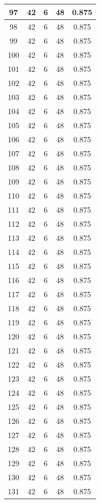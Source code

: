 \documentclass[letterpaper, 12pt]{article}
\begin{document}
\begin{longtable}{|c|c|c|c|c|}
\hline
97 & 42 & 6 & 48 & 0.875 \\
\hline
98 & 42 & 6 & 48 & 0.875 \\
\hline
99 & 42 & 6 & 48 & 0.875 \\
\hline
100 & 42 & 6 & 48 & 0.875 \\
\hline
101 & 42 & 6 & 48 & 0.875 \\
\hline
102 & 42 & 6 & 48 & 0.875 \\
\hline
103 & 42 & 6 & 48 & 0.875 \\
\hline
104 & 42 & 6 & 48 & 0.875 \\
\hline
105 & 42 & 6 & 48 & 0.875 \\
\hline
106 & 42 & 6 & 48 & 0.875 \\
\hline
107 & 42 & 6 & 48 & 0.875 \\
\hline
108 & 42 & 6 & 48 & 0.875 \\
\hline
109 & 42 & 6 & 48 & 0.875 \\
\hline
110 & 42 & 6 & 48 & 0.875 \\
\hline
111 & 42 & 6 & 48 & 0.875 \\
\hline
112 & 42 & 6 & 48 & 0.875 \\
\hline
113 & 42 & 6 & 48 & 0.875 \\
\hline
114 & 42 & 6 & 48 & 0.875 \\
\hline
115 & 42 & 6 & 48 & 0.875 \\
\hline
116 & 42 & 6 & 48 & 0.875 \\
\hline
117 & 42 & 6 & 48 & 0.875 \\
\hline
118 & 42 & 6 & 48 & 0.875 \\
\hline
119 & 42 & 6 & 48 & 0.875 \\
\hline
120 & 42 & 6 & 48 & 0.875 \\
\hline
121 & 42 & 6 & 48 & 0.875 \\
\hline
122 & 42 & 6 & 48 & 0.875 \\
\hline
123 & 42 & 6 & 48 & 0.875 \\
\hline
124 & 42 & 6 & 48 & 0.875 \\
\hline
125 & 42 & 6 & 48 & 0.875 \\
\hline
126 & 42 & 6 & 48 & 0.875 \\
\hline
127 & 42 & 6 & 48 & 0.875 \\
\hline
128 & 42 & 6 & 48 & 0.875 \\
\hline
129 & 42 & 6 & 48 & 0.875 \\
\hline
130 & 42 & 6 & 48 & 0.875 \\
\hline
131 & 42 & 6 & 48 & 0.875 \\

\end{longtable}
\end{document}
